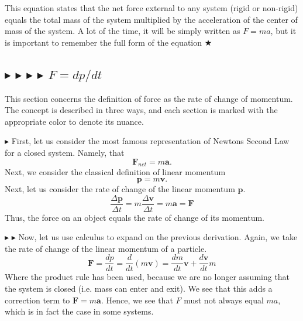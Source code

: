 \noindent This equation states that the net force external to any system (rigid or non-rigid) equals the total mass of the system multiplied by the acceleration of the center of mass of the system. A lot of the time, it will be simply written as $F=ma$, but it is important to remember the full form of the equation $\bigstar$

%
%
\subsection{\color{OrangeRed} $\blacktriangleright$ \color{PineGreen} $\blacktriangleright$ \color{Goldenrod} $\blacktriangleright$ \color{Orchid} $\blacktriangleright$ \color{black} $F=dp/dt$}\label{1.2.2}
\noindent This section concerns the definition of force as the rate of change of momentum. The concept is described in three ways, and each section is marked with the appropriate color to denote its nuance.

\noindent \color{OrangeRed} $\blacktriangleright$ \color{black} First, let us consider the most famous representation of Newtons Second Law for a closed system. Namely, that 
\begin{equation}
    \mathbf{F}_{net}=m\mathbf{a}.
\end{equation}
\noindent Next, we consider the classical definition of linear momentum
\begin{equation}
    \mathbf{p} = m\mathbf{v}.
\end{equation}
\noindent Next, let us consider the rate of change of the linear momentum $\mathbf{p}$.
\begin{equation}
    \frac{\Delta \mathbf{p}}{\Delta t} = m \frac{\Delta \mathbf{v}}{\Delta t} = m\mathbf{a} = \mathbf{F}
\end{equation}
\noindent Thus,  the force on an object equals the rate of change of its momentum.

\noindent \color{PineGreen} $\blacktriangleright$ \color{Goldenrod} $\blacktriangleright$ \color{black} Now, let us use calculus to expand on the previous derivation. Again, we take the rate of change of the linear momentum of a particle.
\begin{equation}
    \mathbf{F} = \frac{dp}{dt} = \frac{d}{dt}(m\mathbf{v}) = \frac{dm}{dt}\mathbf{v} + \frac{d\mathbf{v}}{dt}m
\end{equation}
\noindent Where the product rule has been used, because we are no longer assuming that the system is closed (i.e. mass can enter and exit). We see that this adds a correction term to $\mathbf{F}=m\mathbf{a}$. Hence, we see that $F$ must not always equal $ma$, which is in fact the case in some systems.


